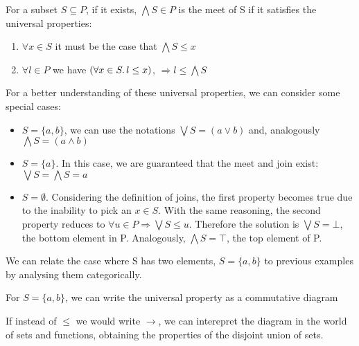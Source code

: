 \begin{definition}[Meets]
\label{defmeets}
    For a subset $S \subseteq P$, if it exists, $\bigwedge S \in P$ is the meet
    of S if it satisfies the universal properties:
        \begin{enumerate}
            \item $\forall x \in S$ it must be the case that $ \bigwedge S \leq x$
            \item $\forall l \in P$ we have $(\forall x \in S \ldotp l \leq x)$,
                $ \Rightarrow l \leq \bigwedge S$
        \end{enumerate}
\end{definition}
For a better understanding of these universal properties, we can consider some
special cases:
\begin{itemize}
    \item $S = \{a, b\}$, we can use the notations $\bigvee S = (a \vee b)$
        and, analogously $\bigwedge S = (a \wedge b)$
    \item $S = \{a\}$. In this case, we are guaranteed that the meet and
        join exist: $\bigvee S = \bigwedge S = a$
    \item $S = \emptyset$. Considering the definition of joins,
        the first property becomes true due to the inability to pick an $x \in S$.
        With the same reasoning, the second property reduces to $\forall u \in P
        \Rightarrow \bigvee S \leq u$. Therefore the solution is $\bigvee S = \bot$,
        the bottom element in P. Analogously, $\bigwedge S = \top$, the top element
        of P.
\end{itemize}

We can relate the case where S has two elements, $S = \{a, b\}$ to previous
examples by analysing them categorically.

For $S = \{a, b\}$, we can write the universal property as a commutative diagram

\begin{center}
\end{center}

If instead of $\leq$ we would write $\rightarrow$, we can interepret the
diagram in the world of sets and functions, obtaining the properties of the
disjoint union of sets.


